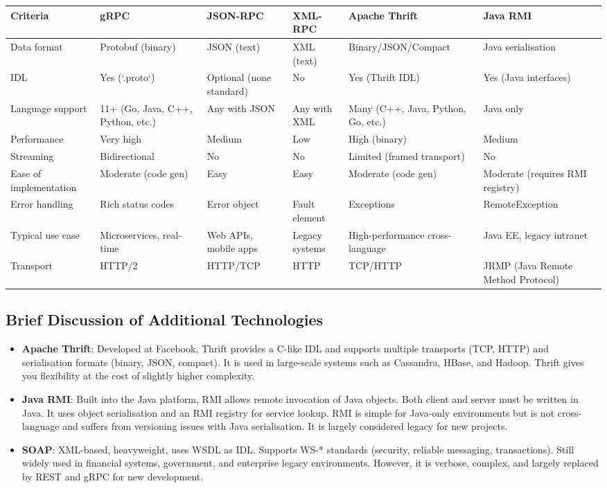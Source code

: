 \documentclass[a4paper]{article}
\begin{document}
\begin{longtable}{|p{2.5cm}|p{2.7cm}|p{2.7cm}|p{2.5cm}|p{2.5cm}|p{2.5cm}|}
\hline
\textbf{Criteria} & \textbf{gRPC} & \textbf{JSON-RPC} & \textbf{XML-RPC} & \textbf{Apache Thrift} & \textbf{Java RMI} \\
\hline
Data format & Protobuf (binary) & JSON (text) & XML (text) & Binary/JSON/Compact & Java serialisation \\
IDL & Yes (`.proto`) & Optional (none standard) & No & Yes (Thrift IDL) & Yes (Java interfaces) \\
Language support & 11+ (Go, Java, C++, Python, etc.) & Any with JSON & Any with XML & Many (C++, Java, Python, Go, etc.) & Java only \\
Performance & Very high & Medium & Low & High (binary) & Medium \\
Streaming & Bidirectional & No & No & Limited (framed transport) & No \\
Ease of implementation & Moderate (code gen) & Easy & Easy & Moderate (code gen) & Moderate (requires RMI registry) \\
Error handling & Rich status codes & Error object & Fault element & Exceptions & RemoteException \\
Typical use case & Microservices, real-time & Web APIs, mobile apps & Legacy systems & High-performance cross-language & Java EE, legacy intranet \\
Transport & HTTP/2 & HTTP/TCP & HTTP & TCP/HTTP & JRMP (Java Remote Method Protocol) \\
\hline
\end{longtable}

\subsection{Brief Discussion of Additional Technologies}
\begin{itemize}
    \item \textbf{Apache Thrift}: Developed at Facebook, Thrift provides a C-like IDL and supports multiple transports (TCP, HTTP) and serialisation formats (binary, JSON, compact). It is used in large-scale systems such as Cassandra, HBase, and Hadoop. Thrift gives you flexibility at the cost of slightly higher complexity.
    \item \textbf{Java RMI}: Built into the Java platform, RMI allows remote invocation of Java objects. Both client and server must be written in Java. It uses object serialisation and an RMI registry for service lookup. RMI is simple for Java-only environments but is not cross-language and suffers from versioning issues with Java serialisation. It is largely considered legacy for new projects.
    \item \textbf{SOAP}: XML-based, heavyweight, uses WSDL as IDL. Supports WS-* standards (security, reliable messaging, transactions). Still widely used in financial systems, government, and enterprise legacy environments. However, it is verbose, complex, and largely replaced by REST and gRPC for new development.
\end{itemize}
\end{document}
